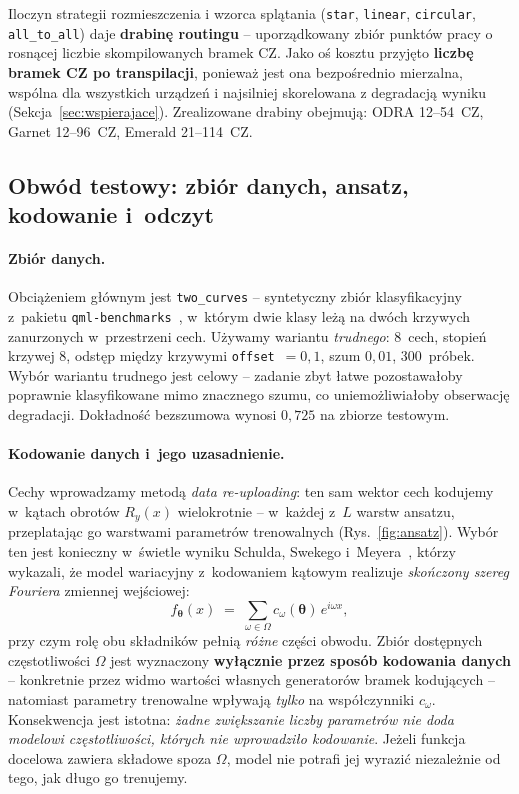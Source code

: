 \documentclass[11pt]{article}
\begin{document}
Iloczyn strategii rozmieszczenia i wzorca splątania (\texttt{star}, \texttt{linear},
\texttt{circular}, \texttt{all\_to\_all}) daje \textbf{drabinę routingu} -- uporządkowany zbiór
punktów pracy o rosnącej liczbie skompilowanych bramek CZ. Jako oś kosztu przyjęto
\textbf{liczbę bramek CZ po transpilacji}, ponieważ jest ona bezpośrednio mierzalna, wspólna dla
wszystkich urządzeń i najsilniej skorelowana z degradacją wyniku (Sekcja~\ref{sec:wspierajace}).
Zrealizowane drabiny obejmują: ODRA 12--54~CZ, Garnet 12--96~CZ, Emerald 21--114~CZ.

\subsection{Obwód testowy: zbiór danych, ansatz, kodowanie i~odczyt}\label{sec:metryki}

\paragraph{Zbiór danych.} Obciążeniem głównym jest \texttt{two\_curves} -- syntetyczny zbiór
klasyfikacyjny z~pakietu \texttt{qml-benchmarks}~\cite{bowles2024}, w~którym dwie klasy leżą na
dwóch krzywych zanurzonych w~przestrzeni cech. Używamy wariantu \emph{trudnego}: 8~cech, stopień
krzywej 8, odstęp między krzywymi \texttt{offset}~$=0{,}1$, szum $0{,}01$, 300~próbek. Wybór wariantu
trudnego jest celowy -- zadanie zbyt łatwe pozostawałoby poprawnie klasyfikowane mimo znacznego
szumu, co uniemożliwiałoby obserwację degradacji. Dokładność bezszumowa wynosi $0{,}725$ na zbiorze
testowym.

\paragraph{Kodowanie danych i~jego uzasadnienie.} Cechy wprowadzamy metodą \emph{data
re-uploading}: ten sam wektor cech kodujemy w~kątach obrotów $R_y(x)$ wielokrotnie -- w~każdej
z~$L$ warstw ansatzu, przeplatając go warstwami parametrów trenowalnych (Rys.~\ref{fig:ansatz}).
Wybór ten jest konieczny w~świetle wyniku Schulda, Swekego i~Meyera~\cite{schuld2021}, którzy
wykazali, że model wariacyjny z~kodowaniem kątowym realizuje \emph{skończony szereg Fouriera}
zmiennej wejściowej:
\begin{equation}
  f_{\boldsymbol\theta}(x) \;=\; \sum_{\omega \in \Omega} c_{\omega}(\boldsymbol\theta)\, e^{i\omega x},
  \label{eq:fourier}
\end{equation}
przy czym rolę obu składników pełnią \emph{różne} części obwodu. Zbiór dostępnych częstotliwości
$\Omega$ jest wyznaczony \textbf{wyłącznie przez sposób kodowania danych} -- konkretnie przez widmo
wartości własnych generatorów bramek kodujących -- natomiast parametry trenowalne wpływają
\emph{tylko} na współczynniki $c_\omega$. Konsekwencja jest istotna: \emph{żadne zwiększanie
liczby parametrów nie doda modelowi częstotliwości, których nie wprowadziło kodowanie}. Jeżeli
funkcja docelowa zawiera składowe spoza $\Omega$, model nie potrafi jej wyrazić niezależnie od
tego, jak długo go trenujemy.
\end{document}
